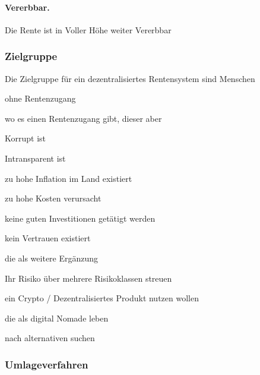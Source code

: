 \paragraph{Vererbbar.} Die Rente ist in Voller Höhe weiter Vererbbar


\subsubsection{Zielgruppe}
Die Zielgruppe für ein dezentralisiertes Rentensystem sind Menschen

\begin{compactitem}
\item ohne Rentenzugang
\item wo es einen Rentenzugang gibt, dieser aber 
 \begin{compactitem}
 \item Korrupt ist
 \item Intransparent ist
 \item zu hohe Inflation im Land existiert
 \item zu hohe Kosten verursacht
 \item keine guten Investitionen getätigt werden
 \item kein Vertrauen existiert
 \end{compactitem}
\item die als weitere Ergänzung 
 \begin{compactitem}
 \item Ihr Risiko über mehrere Risikoklassen streuen
 \item ein Crypto / Dezentralisiertes Produkt nutzen wollen
 \item die als digital Nomade leben
 \item nach alternativen suchen
 \end{compactitem}
\end{compactitem}

\subsubsection{Umlageverfahren}


